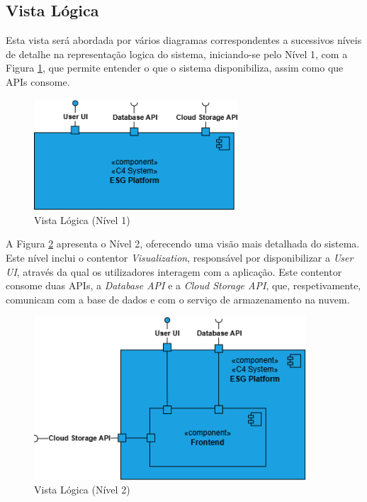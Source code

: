 \subsection{Vista Lógica}

Esta vista será abordada por vários diagramas correspondentes a sucessivos níveis de detalhe na representação logica do sistema, iniciando-se pelo Nível 1, com a Figura \ref{fig:logical_view_lv1}, que permite entender o que o sistema disponibiliza, assim como que APIs consome.

\begin{figure}[H]
    \centering
    \includegraphics[width=3in,keepaspectratio]{frontmatter/assets/diagrams/Logical View/Logical View Lv1.drawio.png}
    \caption{Vista Lógica (Nível 1)}
    \label{fig:logical_view_lv1}
\end{figure}

A Figura \ref{fig:logical_view_lv2} apresenta o Nível 2, oferecendo uma visão mais detalhada do sistema. Este nível inclui o contentor \textit{Visualization}, responsável por disponibilizar a \textit{User UI}, através da qual os utilizadores interagem com a aplicação. Este contentor consome duas APIs, a \textit{Database API} e a \textit{Cloud Storage API}, que, respetivamente, comunicam com a base de dados e com o serviço de armazenamento na nuvem.

\begin{figure}[H]
    \centering
    \includegraphics[width=4in,keepaspectratio]{frontmatter/assets/diagrams/Logical View/Logical View Lv2.drawio.png}
    \caption{Vista Lógica (Nível 2)}
    \label{fig:logical_view_lv2}
\end{figure}

